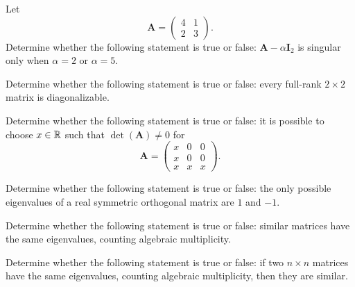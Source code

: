 \documentclass[11pt,oneside]{article}
\begin{document}
\begin{problem}
Let
\[
\mathbf A=
\begin{pmatrix}
4&1\\
2&3
\end{pmatrix}.
\]
Determine whether the following statement is true or false: $\mathbf A-\alpha\mathbf I_2$ is singular only when $\alpha=2$ or $\alpha=5$.
\end{problem}

\begin{problem}
Determine whether the following statement is true or false: every full-rank $2\times2$ matrix is diagonalizable.
\end{problem}

\begin{problem}
Determine whether the following statement is true or false: it is possible to choose $x\in\mathbb{R}$ such that $\det(\mathbf A)\ne0$ for
\[
\mathbf A=
\begin{pmatrix}
x&0&0\\
x&0&0\\
x&x&x
\end{pmatrix}.
\]
\end{problem}

\begin{problem}
Determine whether the following statement is true or false: the only possible eigenvalues of a real symmetric orthogonal matrix are $1$ and $-1$.
\end{problem}

\begin{problem}
Determine whether the following statement is true or false: similar matrices have the same eigenvalues, counting algebraic multiplicity.
\end{problem}

\begin{problem}
Determine whether the following statement is true or false: if two $n\times n$ matrices have the same eigenvalues, counting algebraic multiplicity, then they are similar.
\end{problem}
\end{document}
